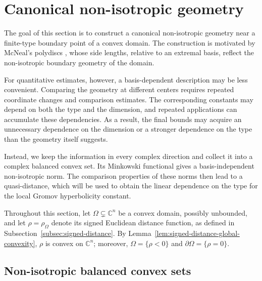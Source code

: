 \documentclass[11pt]{article}
\theoremstyle{definition}
\newcommand{\C}{\mathbb{C}}
\begin{document}
\section{Canonical non-isotropic geometry}
\label{sec:balanced-geometry}

The goal of this section is to construct a canonical non-isotropic geometry
near a finite-type boundary point of a convex domain.  The construction is
motivated by McNeal's polydiscs \cite[Section~2]{McNealBergman}, whose side
lengths, relative to an extremal basis, reflect the non-isotropic boundary
geometry of the domain.

For quantitative estimates, however, a basis-dependent description may be less
convenient.  Comparing the geometry at different centers requires repeated
coordinate changes and comparison estimates.  The corresponding constants
may depend on both the type and the dimension, and repeated applications can
accumulate these dependencies.  As a result, the final bounds may acquire an
unnecessary dependence on the dimension or a stronger dependence on the type
than the geometry itself suggests.

Instead, we keep the information in every complex direction and collect it
into a complex balanced convex set.  Its Minkowski functional gives a
basis-independent non-isotropic norm.  The comparison properties of these
norms then lead to a quasi-distance, which will be used to obtain
the linear dependence on the type for the local Gromov hyperbolicity
constant.

Throughout this section, let \(\Omega\subsetneq\C^n\) be a convex domain,
possibly unbounded, and let \(\rho=\rho_\Omega\) denote its signed Euclidean
distance function, as defined in
Subsection~\ref{subsec:signed-distance}.  By
Lemma~\ref{lem:signed-distance-global-convexity}, \(\rho\) is convex on
\(\C^n\); moreover, \(\Omega=\{\rho<0\}\) and
\(\partial\Omega=\{\rho=0\}\).
\subsection{Non-isotropic balanced convex sets}
\label{subsec:directional-bodies}
\end{document}
